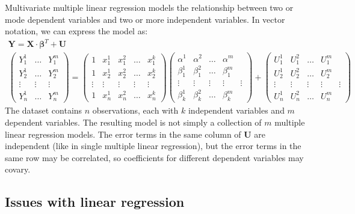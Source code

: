 Multivariate multiple linear regression models the relationship between two or mode dependent variables and two or more independent variables. In vector notation, we can express the model as:
\begin{gather*}
    \mathbf{Y} = \mathbf{X} \cdot \boldsymbol{\beta}^T + \mathbf{U} \\
    \begin{pmatrix}
        Y_1^1 & \dots & Y_1^m \\
        Y_2^1 & \dots & Y_2^m \\
        \vdots & \vdots & \vdots \\
        Y_n^1 & \dots & Y_n^m
    \end{pmatrix} =
    \begin{pmatrix}
        1 & x_1^1 & x_1^2 & \dots & x_1^k \\
        1 & x_2^1 & x_2^2 & \dots & x_2^k \\
        \vdots & \vdots & \vdots & \vdots & \vdots \\
        1 & x_n^1 & x_n^2 & \dots & x_n^k
    \end{pmatrix}
    \begin{pmatrix}
        \alpha^1 & \alpha^2 & \dots & \alpha^m \\
        \beta_1^1 & \beta_1^2 & \dots & \beta_1^m \\
        \vdots & \vdots & \vdots & \vdots & \vdots \\
        \beta_k^1 & \beta_k^2 & \dots & \beta_k^m
    \end{pmatrix} +
    \begin{pmatrix}
        U_1^1 & U_1^2 & \dots & U_1^m \\
        U_2^1 & U_2^2 & \dots & U_2^m \\
        \vdots & \vdots & \vdots & \vdots & \vdots \\
        U_n^1 & U_n^2 & \dots & U_n^m
    \end{pmatrix}
\end{gather*}
The dataset contains $n$ observations, each with $k$ independent variables and $m$ dependent variables. The resulting model is not simply a collection of $m$ multiple linear regression models. The error terms in the same column of $\mathbf{U}$ are independent (like in single multiple linear regression), but the error terms in the same row may be correlated, so coefficients for different dependent variables may covary.

\subsection{Issues with linear regression}
